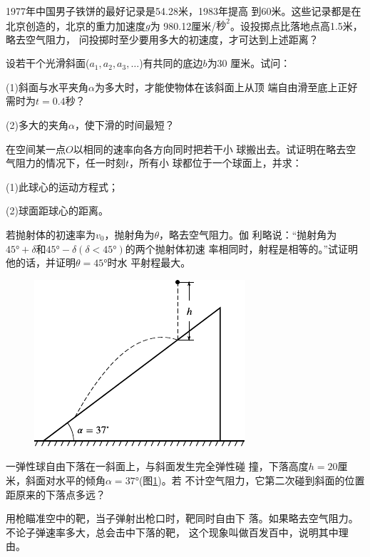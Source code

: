 \begin{exercises}
\exercise 1977年中国男子铁饼的最好记录是54.28米，1983年提高
到60米。这些记录都是在北京创造的，北京的重力加速度$g$为
980.12厘米/$\text{秒}^2$。设投掷点比落地点高1.5米，略去空气阻力，
问投掷时至少要用多大的初速度，才可达到上述距离？

\exercise 设若干个光滑斜面($a_1, a_2, a_3, \dots $)有共同的底边$b$为30
厘米。试问：

(1)斜面与水平夹角$\alpha$为多大时，才能使物体在该斜面上从顶
端自由滑至底上正好需时为$t=0.4$秒？

(2)多大的夹角$\alpha$，使下滑的时间最短？

\exercise 在空间某一点$O$以相同的速率向各方向同时把若干小
球搬出去。试证明在略去空气阻力的情况下，任一时刻$t$，所有小
球都位于一个球面上，并求：

(1)此球心的运动方程式；

(2)球面距球心的距离。

\exercise 若抛射体的初速率为$v_0$，抛射角为$\theta$，略去空气阻力。伽
利略说：“抛射角为$\ang{45;;}+\delta$和$\ang{45;;}-\delta\left(\delta<\ang{45;;}\right)$的两个抛射体初速
率相同时，射程是相等的。”试证明他的话，并证明$\theta=\ang{45;;}$时水
平射程最大。

\begin{figure}
  \vspace{-2.5em}
  \begin{center}
    \includegraphics{figure/fig01.31}
    \caption{}
    \label{fig:01.31}
  \end{center}
\end{figure}
\exercise 一弹性球自由下落在一斜面上，与斜面发生完全弹性碰
撞，下落高度$h=20$厘米，斜面对水平的倾角$\alpha=\ang{37;;}$(图\ref{fig:01.31})。若
不计空气阻力，它第二次碰到斜面的位置距原来的下落点多远？

\exercise 用枪瞄准空中的靶，当子弹射出枪口时，靶同时自由下
落。如果略去空气阻力。不论子弹速率多大，总会击中下落的靶，
这个现象叫做百发百中，说明其中理由。


\end{exercises}
